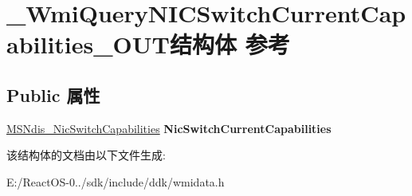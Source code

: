 \hypertarget{struct___wmi_query_n_i_c_switch_current_capabilities___o_u_t}{}\section{\+\_\+\+Wmi\+Query\+N\+I\+C\+Switch\+Current\+Capabilities\+\_\+\+O\+U\+T结构体 参考}
\label{struct___wmi_query_n_i_c_switch_current_capabilities___o_u_t}
\subsection*{Public 属性}
\begin{DoxyCompactItemize}
\item 
\mbox{\label{struct___wmi_query_n_i_c_switch_current_capabilities___o_u_t_adfc78ea46a6c700f0d0a6a3390d32d64}} 
\hyperlink{struct___m_s_ndis___nic_switch_capabilities}{M\+S\+Ndis\+\_\+\+Nic\+Switch\+Capabilities} {\bfseries Nic\+Switch\+Current\+Capabilities}
\end{DoxyCompactItemize}


该结构体的文档由以下文件生成\+:\begin{DoxyCompactItemize}
\item 
E\+:/\+React\+O\+S-\/0../sdk/include/ddk/wmidata.\+h\end{DoxyCompactItemize}
